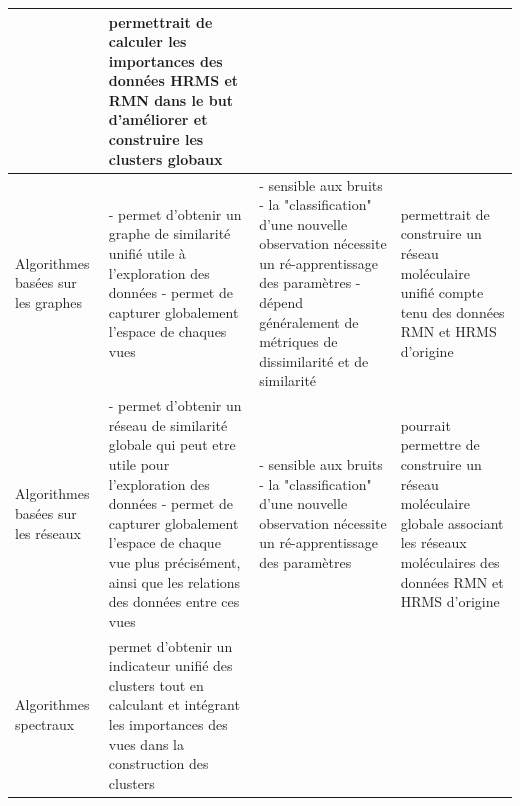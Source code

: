 \documentclass[12pt, french, latin.medieval, a4paper]{report}
\begin{document}
\begin{center}
\begin{longtable}{|p{2.5cm}|p{4.5cm}|p{4.5cm}|p{3cm}|}
                    	&
                    	{ permettrait de calculer les importances des données HRMS et RMN dans le but d'améliorer et construire les clusters globaux}
                    	\\
                    	\hline
                    	Algorithmes basées sur les graphes
                    	&
                    	{- permet d'obtenir un graphe de similarité unifié utile à l'exploration des données} \newline\newline
                    	{- permet de capturer globalement l'espace de chaques vues}
                    	&
                    	{- sensible aux bruits} \newline\newline
                    	{- la "classification" d'une nouvelle observation nécessite un ré-apprentissage des paramètres} \newline\newline
                    	{- dépend généralement de métriques de dissimilarité et de similarité}
                    	&
                    	{  permettrait de construire un réseau moléculaire unifié compte tenu des données RMN et HRMS d'origine}
                    	\\
                    	Algorithmes basées sur les réseaux
                    	&
                    	{- permet d'obtenir un réseau de similarité globale qui peut etre utile pour l'exploration des données} \newline\newline
                    	{- permet de capturer globalement l'espace de chaque vue plus précisément, ainsi que les relations des données entre ces vues} \newline\newline
                    	&
                    	{- sensible aux bruits} \newline\newline
                    	{- la "classification" d'une nouvelle observation nécessite un ré-apprentissage des paramètres} \newline\newline
                    	&
                    	{  pourrait permettre de construire un réseau moléculaire globale associant les réseaux moléculaires des données RMN et HRMS d'origine}
                    	\\
                    	\hline
                    	Algorithmes spectraux
                    	&
                    	{ permet d'obtenir un indicateur unifié des clusters tout en calculant et intégrant les importances des vues dans la construction des clusters}

\end{longtable}
\end{center}
\end{document}
